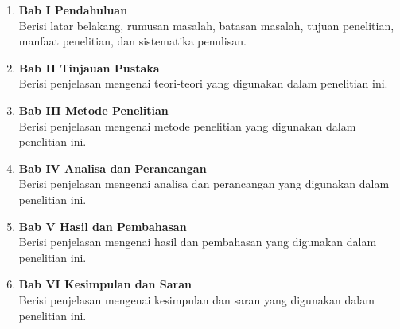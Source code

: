 \begin{enumerate}
    \item \textbf{Bab I Pendahuluan} \\ 
    Berisi latar belakang, rumusan masalah, batasan masalah, tujuan penelitian, manfaat penelitian, dan sistematika penulisan.
    \item \textbf{Bab II Tinjauan Pustaka} \\ 
    Berisi penjelasan mengenai teori-teori yang digunakan dalam penelitian ini.
    \item \textbf{Bab III Metode Penelitian} \\ 
    Berisi penjelasan mengenai metode penelitian yang digunakan dalam penelitian ini.
    \item \textbf{Bab IV Analisa dan Perancangan} \\ 
    Berisi penjelasan mengenai analisa dan perancangan yang digunakan dalam penelitian ini.
    \item \textbf{Bab V Hasil dan Pembahasan} \\ 
    Berisi penjelasan mengenai hasil dan pembahasan yang digunakan dalam penelitian ini.
    \item \textbf{Bab VI Kesimpulan dan Saran} \\ 
    Berisi penjelasan mengenai kesimpulan dan saran yang digunakan dalam penelitian ini.
\end{enumerate}


